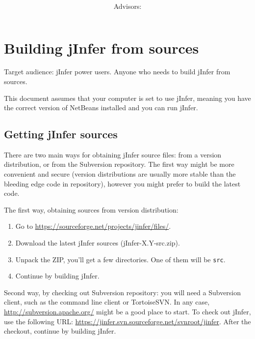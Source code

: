 \documentclass[a4paper,10pt,oneside]{article}
\title{\bf\mftitle}
\author{\mfauthor \\ Advisors: \mfadvisor}
\date{\mfplacedate}
\begin{document}
\maketitle




 
  
 



 \section*{Building jInfer from sources}
\par 
  Target audience: jInfer power users. Anyone who needs to build jInfer from sources.

\par 
  This document assumes that your computer is set to use jInfer, meaning you
    have the correct version of NetBeans installed and you can run jInfer.

\subsection*{Getting jInfer sources}
\par 
There are two main ways for obtaining jInfer source files: from a version
  distribution, or from the Subversion repository. The first way might be more
  convenient and secure (version distributions are usually more stable than the
  bleeding edge code in repository), however you might prefer to build the
  latest code.

\par 
\noindent   The first way, obtaining sources from version distribution:
\begin{enumerate}\item 
 Go to \url{https://sourceforge.net/projects/jinfer/files/}.
  \item Download the latest jInfer sources (jInfer-X.Y-src.zip).
  \item Unpack the ZIP, you'll get a few directories. One of them will be \texttt{src}.
  \item Continue by building jInfer.
  \end{enumerate}
\par 
  Second way, by checking out Subversion repository: you will need a
  Subversion client, such as the command line client or TortoiseSVN. In any case,
  \url{http://subversion.apache.org/}
might be a good place to start. To check out
  jInfer, use the following URL:
  \url{https://jinfer.svn.sourceforge.net/svnroot/jinfer}.
  After the checkout, continue by building jInfer.
\end{document}
